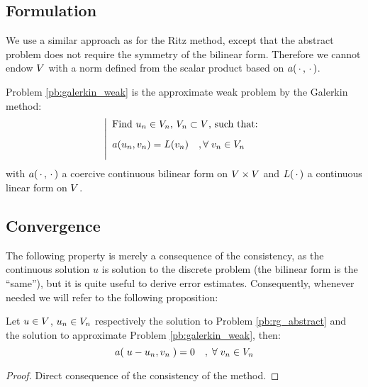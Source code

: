 \subsection{Formulation}

We use a similar approach as for the Ritz method, except that the abstract problem does not require the symmetry of the bilinear form.
Therefore we cannot endow ${V}$ with a norm defined from the scalar product based on $a(\,{\mathbf\cdot}\,,\,{\mathbf\cdot}\,)$.

\medskip
Problem \eqref{pb:galerkin_weak} is the approximate weak problem by the Galerkin method:
\begin{equation}\label{pb:galerkin_weak}
\left\lvert
\begin{array}{ll}
\mbox{Find $u_n \in {V}_n$, ${V}_n \subset {V}$, such that:}\\[2ex]
a( u_n, v_n ) = L(v_n)\quad,{\forall\;}  v_n \in {V}_n\\[2ex]
\end{array}
\right .
\end{equation}
with $a(\,{\mathbf\cdot}\,,\,{\mathbf\cdot}\,)$ a coercive continuous bilinear form on ${V}\times{V}$ and $L(\,{\mathbf\cdot}\,)$ a continuous linear form on ${V}$.


\subsection{Convergence}

The following property is merely a consequence of the consistency, as the continuous solution $u$ is solution to the discrete problem (\ie the bilinear form is the ``same''), but it is quite useful to derive error estimates.
Consequently, whenever needed we will refer to the following proposition:
\begin{prpstn}
 Let $u \in {V}$, $u_n \in {V}_n$ respectively the solution to Problem \eqref{pb:rg_abstract} and the solution to approximate Problem \eqref{pb:galerkin_weak}, then:
\begin{equation*}
a(\;u - u_n, v_n\;) = 0\quad,\;{\forall\;} v_n \in {V}_n
\end{equation*}
\end{prpstn}
\begin{proof}
Direct consequence of the consistency of the method.
\end{proof}

